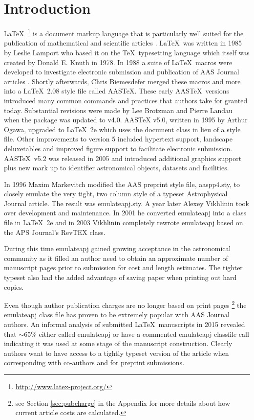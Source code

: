 \documentclass{aastex62}
\newcommand\aastex{AAS\TeX}
\newcommand\latex{La\TeX}
\begin{document}
\section{Introduction} \label{sec:intro}

\latex\ \footnote{\url{http://www.latex-project.org/}} is a document markup
language that is particularly well suited for the publication of
mathematical and scientific articles \citep{lamport94}. \latex\ was written
in 1985 by Leslie Lamport who based it on the \TeX\ typesetting language
which itself was created by Donald E. Knuth in 1978.  In 1988 a suite of
\latex\ macros were developed to investigate electronic submission and
publication of AAS Journal articles \citep{1989BAAS...21..780H}.  Shortly
afterwards, Chris Biemesdefer merged these macros and more into a \latex\
2.08 style file called \aastex.  These early \aastex\ versions introduced
many common commands and practices that authors take for granted today.
Substantial revisions
were made by Lee Brotzman and Pierre Landau when the package was updated to
v4.0.  AASTeX v5.0, written in 1995 by Arthur Ogawa, upgraded to \latex\ 2e
which uses the document class in lieu of a style file.  Other improvements
to version 5 included hypertext support, landscape deluxetables and
improved figure support to facilitate electronic submission.  
\aastex\ v5.2 was released in 2005 and introduced additional graphics
support plus new mark up to identifier astronomical objects, datasets and
facilities.

In 1996 Maxim Markevitch modified the AAS preprint style file, aaspp4.sty,
to closely emulate the very tight, two column style of a typeset
Astrophysical Journal article.  The result was emulateapj.sty.  A year
later Alexey Vikhlinin took over development and maintenance.  In 2001 he
converted emulateapj into a class file in \latex\ 2e and in 2003 Vikhlinin
completely rewrote emulateapj based on the APS Journal's RevTEX class.

During this time emulateapj gained growing acceptance in the astronomical
community as it filled an author need to obtain an approximate number of
manuscript pages prior to submission for cost and length estimates. The
tighter typeset also had the added advantage of saving paper when printing
out hard copies.

Even though author publication charges are no longer based on print pages
\footnote{see Section \ref{sec:pubcharge} in the Appendix for more details
about how current article costs are calculated.} the emulateapj class file
has proven to be extremely popular with AAS Journal authors.  An informal
analysis of submitted \latex\ manuscripts in 2015 revealed that $\sim$65\%
either called emulateapj or have a commented emulateapj classfile call
indicating it was used at some stage of the manuscript construction.
Clearly authors want to have access to a tightly typeset version of the
article when corresponding with co-authors and for preprint submissions.
\end{document}
